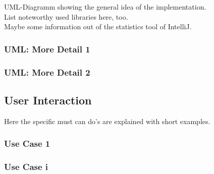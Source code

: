 UML-Diagramm showing the general idea of the implementation.\\
List noteworthy used libraries here, too.\\
Maybe some information out of the statistics tool of IntelliJ.

\subsubsection{UML: More Detail 1}
\subsubsection{UML: More Detail 2}

\pagebreak
\subsection{User Interaction}

\noindent Here the specific must can do's are explained with short examples.
\subsubsection{Use Case 1}
\subsubsection{Use Case i}

\pagebreak